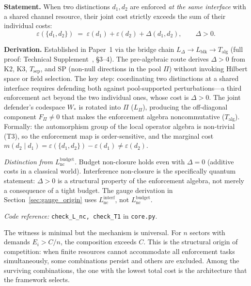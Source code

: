 \documentclass[11pt]{article}
\newcommand{\coderef}[2]{\smallskip\noindent\textit{Code reference:} \texttt{#1} in \texttt{#2}.}
\begin{document}
\begin{tcolorbox}[apfbox, title={Lemma $L_{\mathrm{nc}}^{\mathrm{interf}}$ (Interference Non-Closure)}]
\textbf{Statement.}  When two distinctions $d_1, d_2$ are enforced \emph{at the same interface} with a shared channel resource, their joint cost strictly exceeds the sum of their individual costs:
\begin{equation}
\varepsilon(\{d_1, d_2\}) \;=\; \varepsilon(d_1) + \varepsilon(d_2) + \Delta(d_1, d_2), \qquad \Delta > 0.
\label{eq:superadditivity}
\end{equation}

\smallskip\noindent\textbf{Derivation.}  Established in Paper~1 via the bridge chain $L_\Delta \to L_{\mathrm{blk}} \to T_{\mathrm{alg}}$ (full proof: Technical Supplement~\cite{BrookeSupplement}, \S3--4).  The pre-algebraic route derives $\Delta > 0$ from K2, K3, $T_{\mathrm{sep}}$, and SP (non-null directions in the pool $\Pi$) without invoking Hilbert space or field selection.  The key step: coordinating two distinctions at a shared interface requires defending both against pool-supported perturbations---a third enforcement act beyond the two individual ones, whose cost is $\Delta > 0$.  The joint defender's codespace $W_*$ is rotated into $\Pi$ ($L_\Pi$), producing the off-diagonal component $F_\Pi \ne 0$ that makes the enforcement algebra noncommutative ($T_{\mathrm{alg}}$).  Formally: the automorphism group of the local operator algebra is non-trivial (T3), so the enforcement map is order-sensitive, and the marginal cost $m(d_2 \mid d_1) = \varepsilon(\{d_1,d_2\}) - \varepsilon(d_1) \ne \varepsilon(d_2)$.

\smallskip\noindent\textit{Distinction from $L_{\mathrm{nc}}^{\mathrm{budget}}$.}  Budget non-closure holds even with $\Delta = 0$ (additive costs in a classical world).  Interference non-closure is the specifically quantum statement: $\Delta > 0$ is a structural property of the enforcement algebra, not merely a consequence of a tight budget.  The gauge derivation in Section~\ref{sec:gauge_origin} uses $L_{\mathrm{nc}}^{\mathrm{interf}}$, not $L_{\mathrm{nc}}^{\mathrm{budget}}$.

\coderef{check\_L\_nc, check\_T1}{core.py}
\end{tcolorbox}

The witness is minimal but the mechanism is universal.  For $n$ sectors with demands $E_i > C/n$, the composition exceeds $C$.  This is the structural origin of competition: when finite resources cannot accommodate all enforcement tasks simultaneously, some combinations persist and others are excluded.  Among the surviving combinations, the one with the lowest total cost is the architecture that the framework selects.
\end{document}
